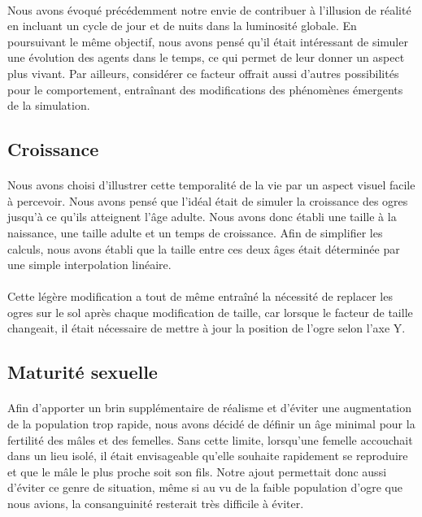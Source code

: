 \paragraph{}
Nous avons évoqué précédemment notre envie de contribuer à l'illusion de
réalité en incluant un cycle de jour et de nuits dans la luminosité globale.
En poursuivant le même objectif, nous avons pensé qu'il était intéressant de
simuler une évolution des agents dans le temps, ce qui permet de leur
donner un aspect plus vivant. Par ailleurs, considérer ce facteur offrait
aussi d'autres possibilités pour le comportement, entraînant des modifications
des phénomènes émergents de la simulation.

\subsection{Croissance}
\paragraph{}
Nous avons choisi d'illustrer cette temporalité de la vie par un aspect visuel
facile à percevoir. Nous avons pensé que l'idéal était de simuler la
croissance des ogres jusqu'à ce qu'ils atteignent l'âge adulte. Nous avons
donc établi une taille à la naissance, une taille adulte et un temps de
croissance. Afin de simplifier les calculs, nous avons établi que la taille
entre ces deux âges était déterminée par une simple interpolation linéaire.

\paragraph{}
Cette légère modification a tout de même entraîné la nécessité de replacer les
ogres sur le sol après chaque modification de taille, car lorsque le facteur
de taille changeait, il était nécessaire de mettre à jour la position de
l'ogre selon l'axe Y.

\subsection{Maturité sexuelle}
\paragraph{}
Afin d'apporter un brin supplémentaire de réalisme et d'éviter une
augmentation de la population trop rapide, nous avons décidé de définir un âge
minimal pour la fertilité des mâles et des femelles. Sans cette limite,
lorsqu'une femelle accouchait dans un lieu isolé, il était envisageable
qu'elle souhaite rapidement se reproduire et que le mâle le plus proche soit
son fils. Notre ajout permettait donc aussi d'éviter ce genre de situation,
même si au vu de la faible population d'ogre que nous avions, la consanguinité
resterait très difficile à éviter.


